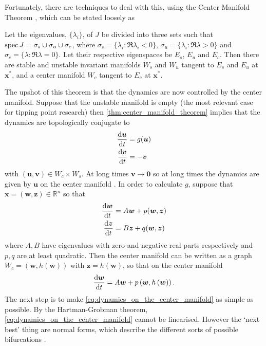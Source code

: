 Fortunately, there are techniques to deal with this, using the Center Manifold Theorem \parencite{Morris1977}, which can be stated loosely as
\begin{theorem}
  \label{thm:center_manifold_theorem}
  Let the eigenvalues, $\{\lambda_i\}$, of $J$ be divided into three sets such that $\operatorname{spec} J = \sigma_s \cup \sigma_u \cup \sigma_c$, where $\sigma_s = \{\lambda_i : \Re \lambda_i < 0\}$,
  $\sigma_u = \{\lambda_i : \Re \lambda > 0\}$ and $\sigma_c = \{\lambda : \Re \lambda = 0\}$.
  Let their respective eigenspaces be $E_s$, $E_u$ and $E_c$. Then there are stable and unstable invariant manifolds $W_s$  and $W_u$ tangent to $E_s$ and  $E_u$ at $\bm{x}^{*}$,
  and a center manifold $W_c$ tangent to $E_c$ at $\bm{x}^*$.
\end{theorem}
The upshot of this theorem is that the dynamics are now controlled by the center manifold. Suppose that the unstable manifold is empty (the most relevant case for tipping point research)
then \cref{thm:center_manifold_theorem} implies that the dynamics are topologically conjugate to
\begin{subequations}
  \label{eq:center_manifold_topological_equivalence}
  \begin{align}
  \dv{\bm{u}}{t} &= g(\bm{u}) \\
  \dv{\bm{v}}{t} &= -\bm{v}
  \end{align}
\end{subequations}
with $(\bm{u},\bm{v}) \in W_c \times W_s$. At long times $\bm{v} \rightarrow \bm{0}$ so at long times the dynamics are given by $\bm{u}$ on the center manifold
\parencite{guckenheimer2013}. In order to calculate $g$, suppose that
$\bm{x} = (\bm{w},\bm{z}) \in \mathbb{R}^n$ so that
\begin{subequations}
  \label{eq:block_diagonal}
  \begin{align}
    \dv{\bm{w}}{t} &= A\bm{w} + p(\bm{w},\bm{z}) \\
    \dv{\bm{z}}{t} &= B\bm{z} + q(\bm{w},\bm{z})
  \end{align}
\end{subequations}
where $A,B$ have eigenvalues with zero and negative real parts respectively and $p,q$ are at least quadratic. Then the center manifold can be written as a graph $W_c = (\bm{w},h(\bm{w}))$
with $\bm{z} = h(\bm{w})$, so that on the center manifold
\begin{equation}
  \label{eq:dynamics_on_the_center_manifold}
  \dv{\bm{w}}{t} = A\bm{w} + p\left(\bm{w},h\left(\bm{w}\right)\right).
\end{equation}
The next step is to make \cref{eq:dynamics_on_the_center_manifold} as simple as possible. By the Hartman-Grobman theorem, \cref{eq:dynamics_on_the_center_manifold}
cannot be linearised. However the `next best' thing are normal forms, which describe the different sorts of possible bifurcations \parencite{Dijkstra2011}.

